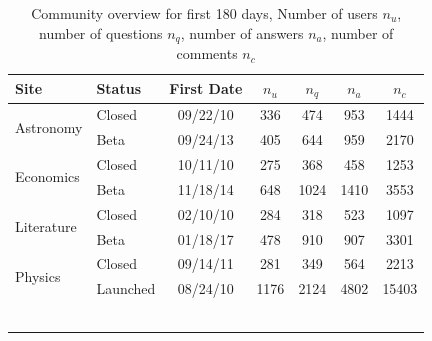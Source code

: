 \begin{table}[h]
	\centering
	\caption[Community overview for first 180 days.]{Community overview for first 180 days, Number of users $n_u$, number of questions $n_q$, number of answers $n_a$, number of comments $n_c$}
	\label{tab:site-info}
	\begin{tabular}{llccccc}
		\toprule
		Site                 & Status                           & First Date                     & $n_u$                    & $n_q$                & $n_a$                  & $n_c$ \\ \hline
		\multirow{2}{*}{Astronomy}  & \multicolumn{1}{l|}{Closed}      & \multicolumn{1}{c|}{09/22/10} & \multicolumn{1}{c|}{336}  & \multicolumn{1}{c|}{474}  & \multicolumn{1}{c|}{953}  & 1444     \\
		& \multicolumn{1}{l|}{Beta} & \multicolumn{1}{c|}{09/24/13} & \multicolumn{1}{c|}{405}  & \multicolumn{1}{c|}{644}  & \multicolumn{1}{c|}{959}  & 2170     \\ \hline
		\multirow{2}{*}{Economics}  & \multicolumn{1}{l|}{Closed}      & \multicolumn{1}{c|}{10/11/10} & \multicolumn{1}{c|}{275}  & \multicolumn{1}{c|}{368}  & \multicolumn{1}{c|}{458}  & 1253     \\
		& \multicolumn{1}{l|}{Beta} & \multicolumn{1}{c|}{11/18/14} & \multicolumn{1}{c|}{648}  & \multicolumn{1}{c|}{1024} & \multicolumn{1}{c|}{1410} & 3553     \\ \hline
		\multirow{2}{*}{Literature} & \multicolumn{1}{l|}{Closed}      & \multicolumn{1}{c|}{02/10/10} & \multicolumn{1}{c|}{284}  & \multicolumn{1}{c|}{318}  & \multicolumn{1}{c|}{523}  & 1097     \\
		& \multicolumn{1}{l|}{Beta} & \multicolumn{1}{c|}{01/18/17} & \multicolumn{1}{c|}{478}  & \multicolumn{1}{c|}{910}  & \multicolumn{1}{c|}{907}  & 3301     \\ \hline
		\multirow{2}{*}{Physics}    & \multicolumn{1}{l|}{Closed}      & \multicolumn{1}{c|}{09/14/11} & \multicolumn{1}{c|}{281}  & \multicolumn{1}{c|}{349}  & \multicolumn{1}{c|}{564}  & 2213     \\
		& \multicolumn{1}{l|}{Launched}    & \multicolumn{1}{c|}{08/24/10} & \multicolumn{1}{c|}{1176} & \multicolumn{1}{c|}{2124} & \multicolumn{1}{c|}{4802} & 15403    \\
		\bottomrule \\~\\
	\end{tabular}
\end{table}


